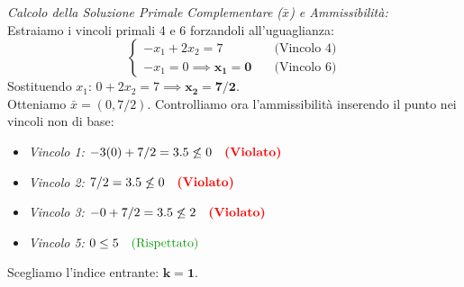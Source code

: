 \documentclass[12pt, a4paper]{article}
\begin{document}
	\textit{Calcolo della Soluzione Primale Complementare ($\bar{x}$) e Ammissibilità:}\\
	Estraiamo i vincoli primali 4 e 6 forzandoli all'uguaglianza:
	\[
	\begin{cases}
		-x_1 + 2x_2 = 7 \quad &\text{(Vincolo 4)} \\
		-x_1 = 0 \implies \mathbf{x_1 = 0} \quad &\text{(Vincolo 6)}
	\end{cases}
	\]
	Sostituendo $x_1$: $0 + 2x_2 = 7 \implies \mathbf{x_2 = 7/2}$.\\
	Otteniamo $\bar{x} = (0, 7/2)$. Controlliamo ora l'ammissibilità inserendo il punto nei vincoli non di base:
	\begin{itemize}[label=$\circ$, itemsep=2pt, leftmargin=1.5cm]
		\item \textit{Vincolo 1:} $-3(0) + 7/2 = 3.5 \not\leq 0 \quad \text{\textcolor{red}{\textbf{(Violato)}}}$
		\item \textit{Vincolo 2:} $7/2 = 3.5 \not\leq 0 \quad \text{\textcolor{red}{\textbf{(Violato)}}}$
		\item \textit{Vincolo 3:} $-0 + 7/2 = 3.5 \not\leq 2 \quad \text{\textcolor{red}{\textbf{(Violato)}}}$
		\item \textit{Vincolo 5:} $0 \leq 5 \quad \text{\textcolor{green!60!black}{(Rispettato)}}$
	\end{itemize}
	
	Scegliamo l'indice entrante: $\mathbf{k = 1}$.
	
\end{document}
